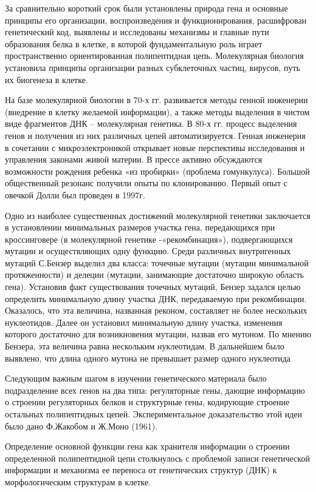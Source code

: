 \documentclass[exam_answers.tex]{subfiles}
\begin{document}
За сравнительно короткий срок были установлены природа гена и
основные принципы его организации, воспроизведения и функционирования,
расшифрован генетический код, выявлены и исследованы механизмы и главные
пути образования белка в клетке, в которой фундаментальную роль играет
пространственно ориентированная полипептидная цепь. Молекулярная
биология установила принципы организации разных субклеточных частиц,
вирусов, путь их биогенеза в клетке.

На базе молекулярной биологии в 70-х гг. развивается методы генной
инженерии (внедрение в клетку желаемой информации), а также методы
выделения в чистом виде фрагментов ДНК – молекулярная генетика. В 80-х гг.
процесс выделения генов и получения из них различных цепей
автоматизируется. Генная инженерия в сочетании с микроэлектроникой
открывает новые перспективы исследования и управления законами живой
материи. В прессе активно обсуждаются возможности рождения ребенка «из
пробирки» (проблема гомункулуса). Большой общественный резонанс
получили опыты по клонированию. Первый опыт с овечкой Долли был
проведен в 1997г.

Одно из наиболее существенных достижений молекулярной генетики
заключается в установлении минимальных размеров участка гена,
передающихся при кроссинговере (в молекулярной генетике -«рекомбинация»),
подвергающихся мутации и осуществляющих одну функцию. Среди различных
внутригенных мутаций С.Бензер выделил два класса: точечные мутации
(мутации минимальной протяженности) и делеции (мутации, занимающие
достаточно широкую область гена). Установив факт существования точечных
мутаций, Бензер задался целью определить минимальную длину участка ДНК,
передаваемую при рекомбинации. Оказалось, что эта величина, названная
реконом, составляет не более нескольких нуклеотидов. Далее он установил
минимальную длину участка, изменения которого достаточно для
возникновения мутации, назвав его мутоном. По мнению Бензера, эта величина
равна нескольким нуклеотидам. В дальнейшем было выявлено, что длина
одного мутона не превышает размер одного нуклеотида

Следующим важным шагом в изучении генетического материала было
подразделение всех генов на два типа: регуляторные гены, дающие
информацию о строении регуляторных белков и структурные гены,
кодирующие строение остальных полипептидных цепей. Экспериментальное
доказательство этой идеи было дано Ф.Жакобом и Ж.Моно (1961).

Определение основной функции гена как хранителя информации о
строении определенной полипептидной цепи столкнулось с проблемой записи
генетической информации и механизма ее переноса от генетических структур
(ДНК) к морфологическим структурам в клетке.
\end{document}
